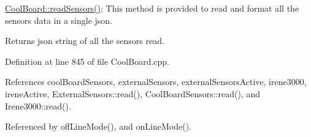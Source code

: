 \hyperlink{classCoolBoard_ad03abdce2e65f520bbf2cff0f2d083cf}{Cool\+Board\+::read\+Sensors()}\+: This method is provided to read and format all the sensors data in a single json.

\begin{DoxyReturn}{Returns}
json string of all the sensors read. 
\end{DoxyReturn}


Definition at line 845 of file Cool\+Board.\+cpp.



References cool\+Board\+Sensors, external\+Sensors, external\+Sensors\+Active, irene3000, irene\+Active, External\+Sensors\+::read(), Cool\+Board\+Sensors\+::read(), and Irene3000\+::read().



Referenced by off\+Line\+Mode(), and on\+Line\+Mode().


